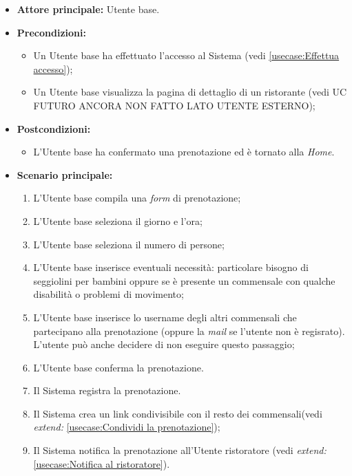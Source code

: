 \label{usecase:Prenotazione di un tavolo}
\begin{itemize}
	\item \textbf{Attore principale:} Utente base.
	\item \textbf{Precondizioni:}
		\begin{itemize}
			\item Un Utente base ha effettuato l'accesso al Sistema (vedi \autoref{usecase:Effettua accesso});
			\item Un Utente base visualizza la pagina di dettaglio di un ristorante (vedi UC FUTURO ANCORA NON FATTO LATO UTENTE ESTERNO);
		\end{itemize}
	\item \textbf{Postcondizioni:}
		\begin{itemize}
			\item L'Utente base ha confermato una prenotazione ed è tornato alla \textit{Home}.
		\end{itemize} 
	      
	\item \textbf{Scenario principale:}
	      \begin{enumerate}
		      \item L'Utente base compila una \textit{form} di prenotazione;
		      \item L'Utente base seleziona il giorno e l'ora;
		      \item L'Utente base seleziona il numero di persone;
		      \item L'Utente base inserisce eventuali necessità: particolare bisogno di seggiolini per bambini oppure se è presente un commensale con qualche disabilità o problemi di movimento;
		      \item L'Utente base inserisce lo username degli altri commensali che partecipano alla prenotazione (oppure la \textit{mail} se l'utente non è regisrato).
			  L'utente può anche decidere di non eseguire questo passaggio;
		      \item L'Utente base conferma la prenotazione.
		      \item Il Sistema registra la prenotazione.
		      \item Il Sistema crea un link condivisibile con il resto dei commensali(vedi \textit{extend:} \autoref{usecase:Condividi la prenotazione});
		      \item Il Sistema notifica la prenotazione all'Utente ristoratore (vedi \textit{extend:} \autoref{usecase:Notifica al ristoratore}).
	      \end{enumerate}


\end{itemize}
